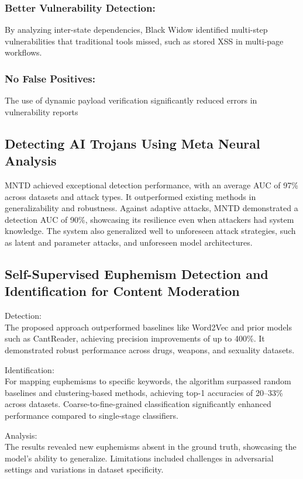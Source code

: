\documentclass[conference]{IEEEtran}
\begin{document}
\subsubsection{Better Vulnerability Detection:}
By analyzing inter-state dependencies, Black Widow identified multi-step vulnerabilities that traditional tools missed, such as stored XSS in multi-page workflows.

\subsubsection{No False Positives:}
The use of dynamic payload verification significantly reduced errors in vulnerability reports

\subsection{\textbf{Detecting AI Trojans Using Meta Neural Analysis}}
MNTD achieved exceptional detection performance, with an average AUC of 97\% across datasets and attack types. It outperformed existing methods in generalizability and robustness. Against adaptive attacks, MNTD demonstrated a detection AUC of 90\%, showcasing its resilience even when attackers had system knowledge. The system also generalized well to unforeseen attack strategies, such as latent and parameter attacks, and unforeseen model architectures.
\subsection{\textbf{Self-Supervised Euphemism Detection and Identification for Content Moderation}}
Detection:\\
The proposed approach outperformed baselines like Word2Vec and prior models such as CantReader, achieving precision improvements of up to 400\%. It demonstrated robust performance across drugs, weapons, and sexuality datasets.

Identification:\\
For mapping euphemisms to specific keywords, the algorithm surpassed random baselines and clustering-based methods, achieving top-1 accuracies of 20–33\% across datasets. Coarse-to-fine-grained classification significantly enhanced performance compared to single-stage classifiers.

Analysis:\\
The results revealed new euphemisms absent in the ground truth, showcasing the model's ability to generalize. Limitations included challenges in adversarial settings and variations in dataset specificity.
\end{document}
